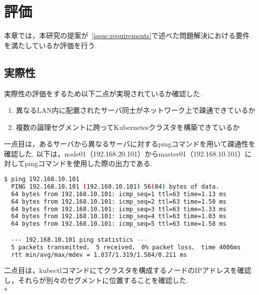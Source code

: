 \chapter{評価}
\label{evaluation}

本章では，本研究の提案が~\ref{issue:requirements}で述べた問題解決における要件を満たしているか評価を行う.

\section{実際性}
\label{evaluation:method}

実際性の評価をするため以下二点が実現されているか確認した.

\begin{enumerate}
  \item 異なるLAN内に配置されたサーバ同士がネットワーク上で疎通できているか
  \item 複数の論理セグメントに跨ってKubernetesクラスタを構築できているか
\end{enumerate}

一点目は，あるサーバから異なるサーバに対するpingコマンドを用いて疎通性を確認した.
以下は，node01（192.168.20.101）からmaster01（192.168.10.101）に対してpingコマンドを使用した際の出力である.

\begin{lstlisting}[language=bash]
  $ ping 192.168.10.101
  PING 192.168.10.101 (192.168.10.101) 56(84) bytes of data.
  64 bytes from 192.168.10.101: icmp_seq=1 ttl=63 time=1.13 ms
  64 bytes from 192.168.10.101: icmp_seq=2 ttl=63 time=1.50 ms
  64 bytes from 192.168.10.101: icmp_seq=3 ttl=63 time=1.33 ms
  64 bytes from 192.168.10.101: icmp_seq=4 ttl=63 time=1.03 ms
  64 bytes from 192.168.10.101: icmp_seq=5 ttl=63 time=1.58 ms

  --- 192.168.10.101 ping statistics ---
  5 packets transmitted， 5 received， 0% packet loss， time 4006ms
  rtt min/avg/max/mdev = 1.037/1.319/1.584/0.211 ms
\end{lstlisting}

二点目は，kubectlコマンドにてクラスタを構成するノードのIPアドレスを確認し，それらが別々のセグメントに位置することを確認した.\\*

